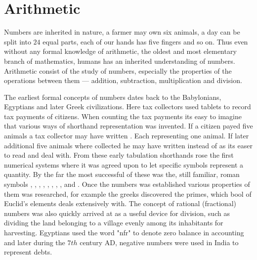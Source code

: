 \chapter{Arithmetic}\label{arit}

Numbers are inherited in nature, a farmer may own six animals, a day can be split into $24$ equal parts, each of our hands has five fingers and so on. Thus even without any formal knowledge of arithmetic, the oldest and most elementary branch of mathematics, humans has an inherited understanding of numbers. Arithmetic consist of the study of numbers, especially the properties of the operations between them — addition, subtraction, multiplication and division.

\myindent The earliest formal concepts of numbers dates back to the Babylonians, Egyptians and later Greek civilizations. Here tax collectors used tablets to record tax payments of citizens. When counting the tax payments its easy to imagine that various ways of shorthand representation was invented. If a citizen payed five animals a tax collector may have written . Each  representing one animal. If later additional five animals where collected he may have written  instead of  as its easer to read and deal with. From these early tabulation shorthands rose the first numerical systems where it was agreed upon to let specific symbols represent a quantity. By the far the most successful of these was the, still familiar, roman symbols , , , , , , , ,  and . Once the numbers was established various properties of them was researched, for example the greeks discovered the primes, which bool  of Euclid's elements deals extensively with. The concept of rational (fractional) numbers was also quickly arrived at as a useful device for division, such as dividing the land belonging to a village evenly among its inhabitants for harvesting. Egyptians used the word "nfr" to denote zero balance in accounting and later during the $7th$ century AD, negative numbers were used in India to represent debts.

